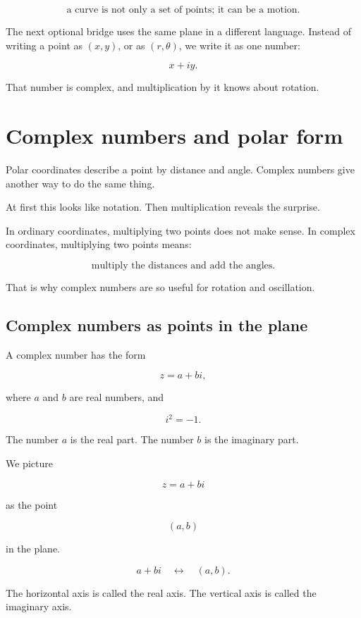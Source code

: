 \[
\text{a curve is not only a set of points; it can be a motion.}
\]

The next optional bridge uses the same plane in a different language.  Instead of writing a
point as \((x,y)\), or as \((r,\theta)\), we write it as one number:

\[
x+iy.
\]

That number is complex, and multiplication by it knows about rotation.

\section{Complex numbers and polar form}
\label{sec:complex-numbers-polar-form}

Polar coordinates describe a point by distance and angle.  Complex numbers give another
way to do the same thing.

At first this looks like notation.  Then multiplication reveals the surprise.

In ordinary coordinates, multiplying two points does not make sense.  In complex
coordinates, multiplying two points means:

\[
\boxed{
\text{multiply the distances and add the angles.}
}
\]

That is why complex numbers are so useful for rotation and oscillation.

\subsection{Complex numbers as points in the plane}
\label{subsec:complex-numbers-points-plane}

A complex number has the form

\[
z=a+bi,
\]

where \(a\) and \(b\) are real numbers, and

\[
i^2=-1.
\]

The number \(a\) is the real part.  The number \(b\) is the imaginary part.

We picture

\[
z=a+bi
\]

as the point

\[
(a,b)
\]

in the plane.

\[
\boxed{
a+bi
\quad\longleftrightarrow\quad
(a,b).
}
\]

The horizontal axis is called the real axis.  The vertical axis is called the imaginary axis.


